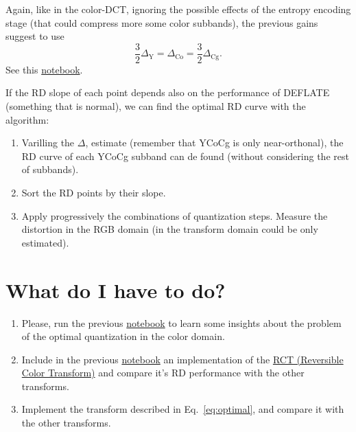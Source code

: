 Again, like in the color-DCT, ignoring the possible effects of the
entropy encoding stage (that could compress more some color subbands),
the previous gains suggest to use
\begin{equation}
  \frac{3}{2}\Delta_{\text{Y}} = \Delta_{\text{Co}} = \frac{3}{2}\Delta_{\text{Cg}}.
\end{equation}
See this \href{https://github.com/Sistemas-Multimedia/Sistemas-Multimedia.github.io/blob/master/milestones/06-YUV_compression/YCrCb_matrix.ipynb}{notebook}.

If the RD slope of each point depends also on the performance of DEFLATE (something that is normal), we can find the optimal RD curve with the algorithm:
\begin{enumerate}
\item Varilling the $\Delta$, estimate (remember that YCoCg is only  near-orthonal), the RD curve of each YCoCg subband can de found (without considering the rest of subbands).
\item Sort the RD points by their slope.
\item Apply progressively the combinations of quantization
  steps. Measure the distortion in the RGB domain (in the transform
  domain could be only estimated).
\end{enumerate}


\section{What do I have to do?}

\begin{enumerate}
\item Please, run the previous
  \href{https://github.com/Sistemas-Multimedia/Sistemas-Multimedia.github.io/blob/master/study_guide/06-color_transform/performance.ipynb}{notebook}
  to learn some insights about the problem of the optimal
  quantization in the color domain.
\item Include in the previous
  \href{https://github.com/Sistemas-Multimedia/Sistemas-Multimedia.github.io/blob/master/study_guide/06-color_transform/performance.ipynb}{notebook}
  an implementation of the
  \href{https://en.wikipedia.org/wiki/JPEG_2000#Color_components_transformation}{RCT
    (Reversible Color Transform)} and compare it's RD performance with
  the other transforms.
\item Implement the transform described in Eq.~\ref{eq:optimal}, and
  compare it with the other transforms.
\end{enumerate}

